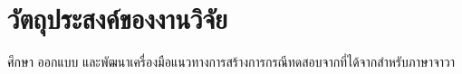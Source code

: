 \section{วัตถุประสงค์ของงานวิจัย}
\label{sec:objective}
    ศึกษา ออกแบบ และพัฒนาเครื่องมือแนวทางการสร้างการกรณีทดสอบจาก{\TestPath}ที่ได้จาก{\scg}สำหรับภาษาจาวา\label{obj:designandresearch}
